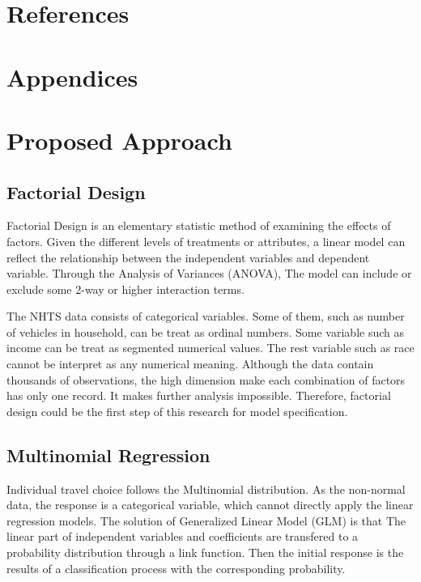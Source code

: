 \documentclass[numbered]{trbunofficial}
\begin{document}
\hypertarget{references}{%
\section{References}\label{references}}

\hypertarget{appendices}{%
\section{Appendices}\label{appendices}}

\hypertarget{proposed-approach}{%
\section{Proposed Approach}\label{proposed-approach}}

\hypertarget{factorial-design}{%
\subsection{Factorial Design}\label{factorial-design}}

Factorial Design is an elementary statistic method of examining the effects of factors. Given the different levels of treatments or attributes, a linear model can reflect the relationship between the independent variables and dependent variable. Through the Analysis of Variances (ANOVA), The model can include or exclude some 2-way or higher interaction terms.

The NHTS data consists of categorical variables. Some of them, such as number of vehicles in household, can be treat as ordinal numbers. Some variable such as income can be treat as segmented numerical values. The rest variable such as race cannot be interpret as any numerical meaning. Although the data contain thousands of observations, the high dimension make each combination of factors has only one record. It makes further analysis impossible. Therefore, factorial design could be the first step of this research for model specification.

\hypertarget{multinomial-regression}{%
\subsection{Multinomial Regression}\label{multinomial-regression}}

Individual travel choice follows the Multinomial distribution.
As the non-normal data, the response is a categorical variable, which cannot directly apply the linear regression models. The solution of Generalized Linear Model (GLM) is that The linear part of independent variables and coefficients are transfered to a probability distribution through a link function. Then the initial response is the results of a classification process with the corresponding probability.
\end{document}
